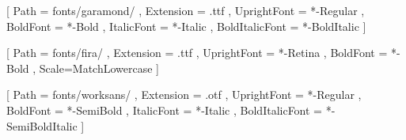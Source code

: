 

\lstset{
    language = Python,
    breaklines=true,
    escapeinside=||
}






\newsavebox{\marginfloatbox}
\newenvironment{marginfloat}[2][-1.2ex]%
  {\FloatBarrier%
  \begin{lrbox}{\marginfloatbox}%
  \begin{minipage}{\marginparwidth}%
    \def\@captype{#2}%
    \hbox{}\vspace*{#1}%
    \renewcommand{\baselinestretch}{1}
    \noindent%
  }
  {\end{minipage}%
  \end{lrbox}%
  \marginpar{\usebox{\marginfloatbox}}%
  \renewcommand{\baselinestretch}{1.5}%
  }

\captionsetup[lstfloat]{skip=0pt}

\lstset{aboveskip=0pt,belowskip=0pt}




\setmainfont{EBGaramond}[
	Path = fonts/garamond/ ,
	Extension = .ttf ,
	UprightFont = *-Regular ,
	BoldFont = *-Bold ,
	ItalicFont = *-Italic ,
	BoldItalicFont = *-BoldItalic
]

\setmonofont{FiraCode}[
  Path = fonts/fira/ ,
  Extension = .ttf ,
  UprightFont = *-Retina ,
  BoldFont = *-Bold ,
  Scale=MatchLowercase
]

\setsansfont{WorkSans}[
  Path = fonts/worksans/ ,
  Extension = .otf ,
  UprightFont = *-Regular ,
  BoldFont = *-SemiBold ,
  ItalicFont = *-Italic ,
  BoldItalicFont = *-SemiBoldItalic
]

\newcommand{\changelocaltocdepth}[1]{%
  \addtocontents{toc}{\protect\setcounter{tocdepth}{#1}}%
  \setcounter{tocdepth}{#1}%
}




